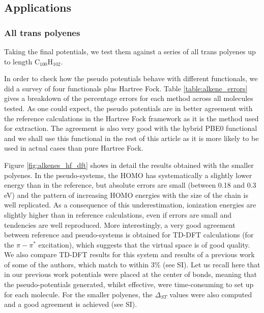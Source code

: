 \documentclass[12pt]{article}
\begin{document}
\subsection*{\sffamily \large Applications}

\subsubsection*{\sffamily \large All trans polyenes}

Taking the final potentials, we test them against a series of all trans polyenes up to length C\(_{100}\)H\(_{102}\).

In order to check how the pseudo potentials behave with different functionals, we did a survey of four functionals plus Hartree Fock.
Table \ref{table:alkene_errors} gives a breakdown of the percentage errors for each method across all molecules tested.
As one could expect, the pseudo potentials are in better agreement with the reference calculations
in the Hartree Fock framework as it is the method used for extraction.
The agreement is also very good with the hybrid PBE0 functional and we shall use this functional
in the rest of this article as it is more likely to be used in actual cases than pure Hartree Fock.

Figure \ref{fig:alkenes_hf_dft} shows in detail the results obtained with the smaller polyenes.
In the pseudo-systems, the HOMO has systematically a slightly lower energy than in the reference, but 
absolute errors are small (between 0.18 and 0.3 eV) and the pattern of increasing HOMO energies
with the size of the chain is well replicated. As a consequence of this underestimation, 
ionization energies are slightly higher than in reference calculations, even if errors are small and
 tendencies are well reproduced. 
More interestingly, a very good agreement between reference and pseudo-systems is obtained for TD-DFT
calculations (for the $\pi-\pi^*$ excitation), which suggests that the virtual space is of good
quality.
We also compare TD-DFT results for this system and results of a previous work of some of the authors, which match to within 3\% (see SI).\cite{drujon_pseudopotentials_2013}
Let us recall here that in our previous work potentials were placed at the center of bonds, meaning that the pseudo-potentials generated, whilst effective, were time-consuming to set up for each molecule.
For the smaller polyenes, the $\Delta_{ST}$ values were also computed and a good agreement is achieved (see SI).
\end{document}
